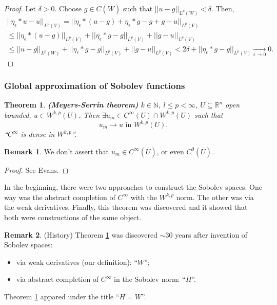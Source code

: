\documentclass[12pt]{article}
\newtheorem{theorem}{Theorem}[section]
\theoremstyle{definition}
\newtheorem*{remark}{Remark}
\begin{document}
\begin{proof}
Let $\delta>0$. Choose $g\in C(\overline{W})$ such that $||u-g||_{L^p(W)}<\delta$. Then,
\begin{multline*}
||\eta_{\epsilon}*u-u||_{L^p(V)}=\big|\big|\eta_{\epsilon}*(u-g)+\eta_{\epsilon}*g-g+g-u\big|\big|_{L^p(V)}\\
\leq\big|\big|\eta_{\epsilon}*(u-g)\big|\big|_{L^p(V)}+||\eta_{\epsilon}*g-g||_{L^p(V)}+||g-u||_{L^p(V)}\\
\leq||u-g||_{L^p(W)}+||\eta_{\epsilon}*g-g||_{L^p(V)}+||g-u||_{L^p(V)}<2\delta+||\eta_{\epsilon}*g-g||_{L^p(V)}\xrightarrow[\epsilon\to0]{}0.
\end{multline*}
\end{proof}

\subsubsection{Global approximation of Sobolev functions}
\begin{theorem}\label{Meyers_Serrin}
\emph{\textbf{(Meyers-Serrin theorem)}} $k\in\mathbb{N}$, $l\leq p<\infty$, $U\subseteq\mathbb{R}^n$ open bounded, $u\in W^{k,p}(U)$. Then $\exists u_m\in C^{\infty}(U)\cap W^{k,p}(U)$ such that
\[u_m\longrightarrow u\text{ in }W^{k,p}(U).\]
``$C^{\infty}$ is dense in $W^{k,p}$''.
\end{theorem}

\begin{remark}
We don't assert that $u_m\in C^{\infty}(\overline{U})$, or even $C^0(\overline{U})$.
\end{remark}

\begin{proof}
See Evans.
\end{proof}

In the beginning, there were two approaches to construct the Sobolev spaces. One way was the abstract completion of $C^{\infty}$ with the $W^{k,p}$ norm. The other was via the weak derivatives. Finally, this theorem was discovered and it showed that both were constructions of the same object.

\begin{remark}
(History) Theorem \ref{Meyers_Serrin} was discovered $\sim30$ years after invention of Sobolev spaces:
\begin{itemize}
\item via weak derivatives (our definition): ``$W$'';
\item via abstract completion of $C^{\infty}$ in the Sobolev norm: ``$H$''.
\end{itemize}
Theorem \ref{Meyers_Serrin} appared under the title ``$H=W$''.
\end{remark}
\end{document}
